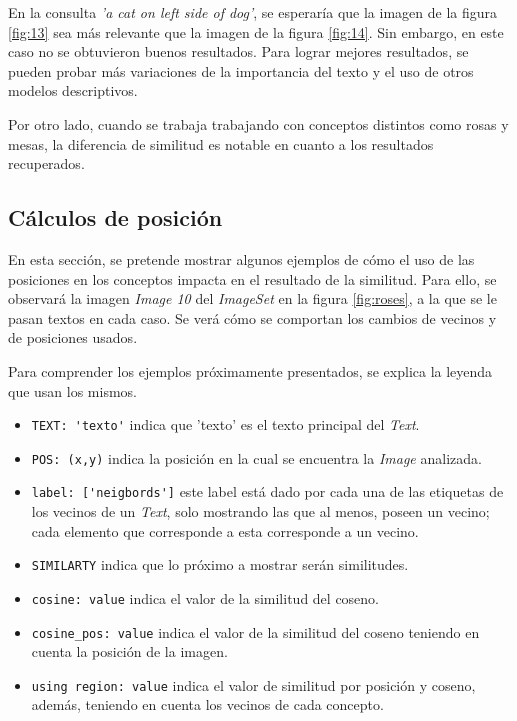 En la consulta \textit{'a cat on left side of dog'}, se esperaría que la imagen de la figura \ref{fig:13} sea m\'as relevante que la imagen de la figura \ref{fig:14}. Sin embargo, en este caso no se obtuvieron buenos resultados. Para lograr mejores resultados, se pueden probar m\'as variaciones de la importancia del texto y el uso de otros modelos descriptivos.

Por otro lado, cuando se trabaja trabajando con conceptos distintos como rosas y mesas, la diferencia de similitud es notable en cuanto a los resultados recuperados.

\subsection{C\'alculos de posici\'on}
En esta sección, se pretende mostrar algunos ejemplos de cómo el uso de las posiciones en los conceptos impacta en el resultado de la similitud. Para ello, se observar\'a la imagen \textit{Image 10} del \textit{ImageSet} en la figura \ref{fig:roses}, a la que se le pasan textos en cada caso. Se ver\'a cómo se comportan los cambios de vecinos y de posiciones usados.

Para comprender los ejemplos próximamente presentados, se explica la leyenda que usan los mismos.

\begin{itemize}
\item \verb|TEXT: 'texto'| indica que 'texto' es el texto principal del \textit{Text}.
\item \verb|POS: (x,y)| indica la posici\'on en la cual se encuentra la \textit{Image} analizada.
\item \verb|label: ['neigbords']| este label est\'a dado por cada una de las etiquetas de los vecinos de un \textit{Text}, solo mostrando las que al menos, poseen un vecino; cada elemento que corresponde a esta corresponde a un vecino.
\item \verb|SIMILARTY| indica que lo pr\'oximo a mostrar ser\'an similitudes.
\item \verb|cosine: value| indica el valor de la similitud del coseno.
\item \verb|cosine_pos: value| indica el valor de la similitud del coseno teniendo en cuenta la posici\'on de la imagen.
\item \verb|using region: value| indica el valor de similitud por posici\'on y coseno, adem\'as, teniendo en cuenta los vecinos de cada concepto.
\end{itemize}

